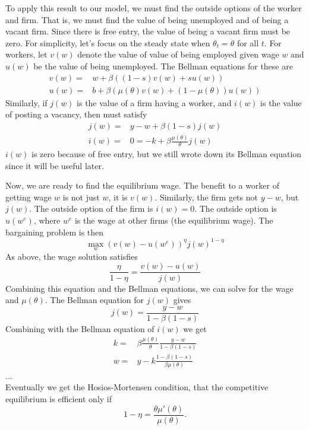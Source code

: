 \documentclass[12pt,reqno]{amsart}
\theoremstyle{definition}
\begin{document}
To apply this result to our model, we must find the outside options of
the worker and firm. That is, we must find the value of being
unemployed and of being a vacant firm. Since there is free entry, the
value of being a vacant firm must be zero. For simplicity, let's focus
on the steady state when $\theta_t = \theta$ for all $t$. For workers,
let $v(w)$ denote the value of value of being employed given wage $w$
and $u(w)$ be the value of being unemployed. The Bellman equations for
these are
\begin{align*}
  v(w) = & w + \beta \left( (1-s) v(w) + s u(w) \right) \\
  u(w) = & b + \beta \left( \mu(\theta) v(w) + (1-\mu(\theta)) u(w)
  \right) 
\end{align*}
Similarly, if $j(w)$ is the value of a firm having a worker, and
$i(w)$ is the value of posting a vacancy, then must satisfy
\begin{align*}
  j(w) = & y - w + \beta (1-s)j(w) \\
  i(w) = & 0 = -k + \beta \frac{\mu(\theta)}{\theta} j(w)
\end{align*}
$i(w)$ is zero because of free entry, but we still wrote down its
Bellman equation since it will be useful later. 

Now, we are ready to find the equilibrium wage. The benefit to a
worker of getting wage $w$ is not just $w$, it is $v(w)$. Similarly,
the firm gets not $y-w$, but $j(w)$. The outside option of the firm is
$i(w) = 0$. The outside option is $u(w^e)$, where $w^e$ is the wage at
other firms (the equilibrium wage). The bargaining problem is then
\[ \max_w \left( v(w) - u(w^e) \right)^\eta j(w)^{1-\eta} \]
As above, the wage solution satisfies
\[ \frac{\eta}{1-\eta} = \frac{v(w) - u(w)}{j(w)} \]
Combining this equation and the Bellman equations, we can solve for
the wage and $\mu(\theta)$. The Bellman equation for $j(w)$ gives
\[ j(w) = \frac{y-w}{1-\beta(1-s)} \]
Combining with the Bellman equation of $i(w)$ we get
\begin{align*}
  k = & \beta \frac{\mu(\theta)}{\theta}  \frac{y-w}{1-\beta(1-s)} \\ 
  w = & y - k \frac{1-\beta(1-s)}{\beta \mu(\theta)} 
\end{align*}
... \\
Eventually we get the Hosios-Mortensen condition, that the competitive
equilibrium is efficient only if
\[1-\eta = \frac{\theta\mu'(\theta)} {\mu(\theta)}. \]
\end{document}
